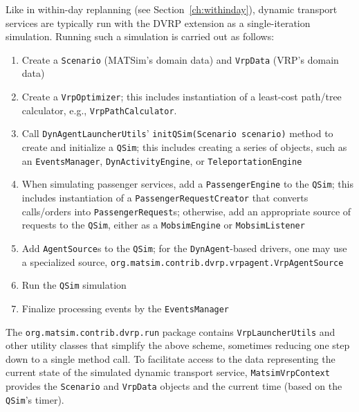 Like in within-day replanning (see Section~\ref{ch:withinday}), dynamic transport services are typically run with the DVRP extension as a single-iteration simulation. Running such a simulation is carried out as follows:
%
\begin{enumerate}
	\item Create a \lstinline$Scenario$ (MATSim's domain data) and \lstinline$VrpData$ (VRP's domain data)
	
	\item Create a \lstinline$VrpOptimizer$; this includes instantiation of a least-cost path/tree calculator, e.g., \lstinline$VrpPathCalculator$.
	
	\item Call \lstinline$DynAgentLauncherUtils$' \lstinline$initQSim(Scenario scenario)$ method to create and initialize a \lstinline$QSim$; this includes creating a series of objects, such as an \lstinline$EventsManager$, \lstinline$DynActivityEngine$, or \lstinline$TeleportationEngine$
	
	\item When simulating passenger services, add a \lstinline$PassengerEngine$ to the \lstinline$QSim$; this includes instantiation of a \lstinline$PassengerRequestCreator$ that converts calls/orders into \lstinline$PassengerRequest$s; otherwise, add an appropriate source of requests to the \lstinline$QSim$, either as a \lstinline$MobsimEngine$ or \lstinline$MobsimListener$
	
	\item Add \lstinline$AgentSource$s to the \lstinline$QSim$; for the \lstinline$DynAgent$-based drivers, one may use a specialized source, \lstinline$org.matsim.contrib.dvrp.vrpagent.VrpAgentSource$
	
	\item Run the \lstinline$QSim$ simulation
	
	\item Finalize processing events by the \lstinline$EventsManager$
\end{enumerate}

The \lstinline$org.matsim.contrib.dvrp.run$ package contains \lstinline$VrpLauncherUtils$ and other utility classes that simplify the above scheme, sometimes reducing one step down to a single method call. To facilitate access to the data representing the current state of the simulated dynamic transport service, \lstinline$MatsimVrpContext$ provides the \lstinline$Scenario$ and \lstinline$VrpData$ objects and the current time (based on the \lstinline$QSim$'s timer).

